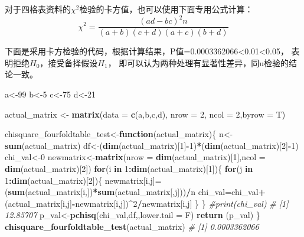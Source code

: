 \documentclass[
]{article}
\newenvironment{Shaded}{\begin{snugshade}}{\end{snugshade}}
\newcommand{\CommentTok}[1]{\textcolor[rgb]{0.56,0.35,0.01}{\textit{#1}}}
\newcommand{\ControlFlowTok}[1]{\textcolor[rgb]{0.13,0.29,0.53}{\textbf{#1}}}
\newcommand{\DataTypeTok}[1]{\textcolor[rgb]{0.13,0.29,0.53}{#1}}
\newcommand{\DecValTok}[1]{\textcolor[rgb]{0.00,0.00,0.81}{#1}}
\newcommand{\KeywordTok}[1]{\textcolor[rgb]{0.13,0.29,0.53}{\textbf{#1}}}
\newcommand{\NormalTok}[1]{#1}
\newcommand{\OperatorTok}[1]{\textcolor[rgb]{0.81,0.36,0.00}{\textbf{#1}}}
\newcommand{\StringTok}[1]{\textcolor[rgb]{0.31,0.60,0.02}{#1}}
\begin{document}
对于四格表资料的\(\chi^2\)检验的卡方值，也可以使用下面专用公式计算：
\[\chi^2=\frac{(ad-bc)^2n}{(a+b)(c+d)(a+c)(b+d)}\]

下面是采用卡方检验的代码，根据计算结果，P值=0.0003362066\textless0.01\textless0.05， 表明拒绝\(H_0\)，接受备择假设\(H_1\)，
即可以认为两种处理有显著性差异，同u检验的结论一致。

\begin{Shaded}
\begin{Highlighting}[]
\NormalTok{a<-}\DecValTok{99}
\NormalTok{b<-}\DecValTok{5}
\NormalTok{c<-}\DecValTok{75}
\NormalTok{d<-}\DecValTok{21}

\NormalTok{actual_matrix <-}\StringTok{ }\KeywordTok{matrix}\NormalTok{(}\DataTypeTok{data =} \KeywordTok{c}\NormalTok{(a,b,c,d), }\DataTypeTok{nrow =} \DecValTok{2}\NormalTok{, }\DataTypeTok{ncol =} \DecValTok{2}\NormalTok{,}\DataTypeTok{byrow =}\NormalTok{ T)}

\NormalTok{chisquare_fourfoldtable_test<-}\ControlFlowTok{function}\NormalTok{(actual_matrix)\{}
\NormalTok{     n<-}\KeywordTok{sum}\NormalTok{(actual_matrix)}
\NormalTok{     df<-(}\KeywordTok{dim}\NormalTok{(actual_matrix)[}\DecValTok{1}\NormalTok{]}\OperatorTok{-}\DecValTok{1}\NormalTok{)}\OperatorTok{*}\NormalTok{(}\KeywordTok{dim}\NormalTok{(actual_matrix)[}\DecValTok{2}\NormalTok{]}\OperatorTok{-}\DecValTok{1}\NormalTok{)}
\NormalTok{     chi_val<-}\DecValTok{0}
\NormalTok{     newmatrix<-}\KeywordTok{matrix}\NormalTok{(}\DataTypeTok{nrow =} \KeywordTok{dim}\NormalTok{(actual_matrix)[}\DecValTok{1}\NormalTok{],}\DataTypeTok{ncol =} \KeywordTok{dim}\NormalTok{(actual_matrix)[}\DecValTok{2}\NormalTok{])}
     \ControlFlowTok{for}\NormalTok{(i }\ControlFlowTok{in} \DecValTok{1}\OperatorTok{:}\KeywordTok{dim}\NormalTok{(actual_matrix)[}\DecValTok{1}\NormalTok{])\{}
          \ControlFlowTok{for}\NormalTok{(j }\ControlFlowTok{in} \DecValTok{1}\OperatorTok{:}\KeywordTok{dim}\NormalTok{(actual_matrix)[}\DecValTok{2}\NormalTok{])\{}
\NormalTok{          newmatrix[i,j]=(}\KeywordTok{sum}\NormalTok{(actual_matrix[i,])}\OperatorTok{*}\KeywordTok{sum}\NormalTok{(actual_matrix[,j]))}\OperatorTok{/}\NormalTok{n}
\NormalTok{          chi_val=chi_val}\OperatorTok{+}\NormalTok{(actual_matrix[i,j]}\OperatorTok{-}\NormalTok{newmatrix[i,j])}\OperatorTok{^}\DecValTok{2}\OperatorTok{/}\NormalTok{newmatrix[i,j]}
\NormalTok{          \}}
\NormalTok{     \}}
     \CommentTok{#print(chi_val)}
     \CommentTok{# [1] 12.85707}
\NormalTok{    p_val<-}\KeywordTok{pchisq}\NormalTok{(chi_val,df,,}\DataTypeTok{lower.tail =}\NormalTok{ F)}
     \KeywordTok{return}\NormalTok{ (p_val)}
\NormalTok{\}}
\KeywordTok{chisquare_fourfoldtable_test}\NormalTok{(actual_matrix)}
\CommentTok{# [1] 0.0003362066}


\end{Highlighting}
\end{Shaded}
\end{document}
